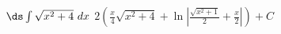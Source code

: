 {$\ds \int \sqrt{x^2+4}\ dx$
}
{$2\left(\frac x4\sqrt{x^2+4}+\ln |\frac{\sqrt{x^2+1}}2+\frac x2|\right) + C$
}